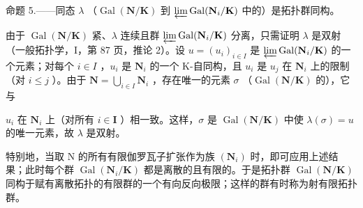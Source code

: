 命题 5.——同态 \(\lambda\) （\(\operatorname{Gal}(\mathbf{N}/\mathbf{K})\) 到 \(\varprojlim \operatorname{Gal}(\mathbf{N}_i/\mathbf{K})\) 中的）是拓扑群同构。

由于 \(\operatorname{Gal}(\mathbf{N}/\mathbf{K})\) 紧、\(\lambda\) 连续且群 \(\varprojlim \operatorname{Gal}(\mathbf{N}_i/\mathbf{K})\) 分离，只需证明 \(\lambda\) 是双射（一般拓扑学，I，第 87 页，推论 2）。设 \(u = (u_i)_{i \in I}\) 是 \(\varprojlim \operatorname{Gal}(\mathbf{N}_i/\mathbf{K})\) 的一个元素；对每个 \(i \in I\) ，\(u_i\) 是 \(\mathbf{N}_i\) 的一个 K-自同构，且 \(u_i\) 是 \(u_j\) 在 \(\mathbf{N}_i\) 上的限制（对 \(i \leqslant j\) ）。由于 \(\mathbf{N} = \bigcup_{i \in I} \mathbf{N}_i\) ，存在唯一的元素 \(\sigma\) （\(\operatorname{Gal}(\mathbf{N}/\mathbf{K})\) 的），它与

\(u_{i}\) 在 \(\mathbf{N}_i\) 上（对所有 \(i\in \mathbf{I}\) ）相一致。这样，\(\sigma\) 是 \(\operatorname {Gal}(\mathbf{N} / \mathbf{K})\) 中使 \(\lambda (\sigma) = u\) 的唯一元素，故 \(\lambda\) 是双射。

特别地，当取 N 的所有有限伽罗瓦子扩张作为族 \((\mathbf{N}_{i})\) 时，即可应用上述结果；此时每个群 \(\operatorname{Gal}(\mathbf{N}_{i}/\mathbf{K})\) 都是离散的且有限的。于是拓扑群 \(\operatorname{Gal}(\mathbf{N}/\mathbf{K})\) 同构于赋有离散拓扑的有限群的一个有向反向极限；这样的群有时称为射有限拓扑群。

